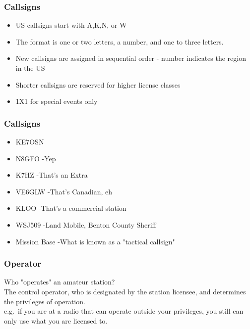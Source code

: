 \documentclass[10pt]{beamer}
\begin{document}
\begin{frame}
\frametitle{Callsigns}
\begin{itemize}
\item US callsigns start with A,K,N, or W
\item The format is one or two letters, a number, and one to three letters.
\item New callsigns are assigned in sequential order - number indicates the region in the US
\item Shorter callsigns are reserved for higher license classes
\item 1X1 for special events only
\end{itemize}
\end{frame}

\begin{frame}
\frametitle{Callsigns}
\begin{itemize}
\item KE7OSN
\item N8GFO \pause -Yep\pause
\item K7HZ \pause -That's an Extra\pause
\item VE6GLW \pause -That's Canadian, eh\pause
\item KLOO \pause -That's a commercial station\pause
\item WSJ509 \pause -Land Mobile, Benton County Sheriff\pause
\item Mission Base \pause -What is known as a "tactical callsign"\pause
\end{itemize}
\end{frame}


\begin{frame}
\frametitle{Operator}
Who "operates" an amateur station? \pause \\
The control operator, who is designated by the station licensee, and determines the privileges of operation.\\
e.g.\ if you are at a radio that can operate outside your privileges, you still can only use what you are licensed to.
\end{frame}
\end{document}
